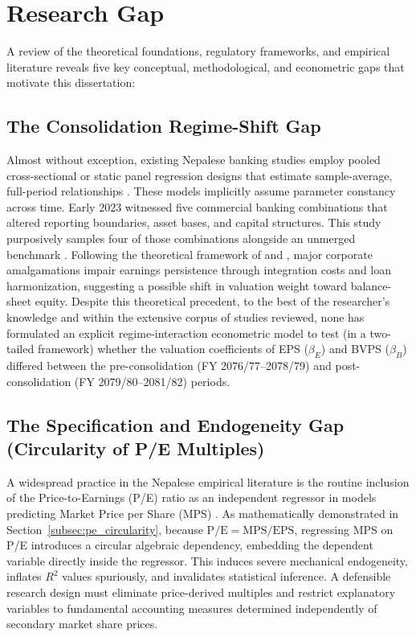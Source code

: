 \section{Research Gap}
\label{sec:research_gap}

A review of the theoretical foundations, regulatory frameworks, and empirical literature reveals five key conceptual, methodological, and econometric gaps that motivate this dissertation:

\subsection{The Consolidation Regime-Shift Gap}
Almost without exception, existing Nepalese banking studies employ pooled cross-sectional or static panel regression designs that estimate sample-average, full-period relationships \citep{bhattarai2014,chaudhari2025,chhetri2023,timalsina2026}. These models implicitly assume parameter constancy across time. Early 2023 witnessed five commercial banking combinations that altered reporting boundaries, asset bases, and capital structures. This study purposively samples four of those combinations alongside an unmerged benchmark \citep{nrb2023bsr}. Following the theoretical framework of \citet{kwon2020} and \citet{collins1997}, major corporate amalgamations impair earnings persistence through integration costs and loan harmonization, suggesting a possible shift in valuation weight toward balance-sheet equity. Despite this theoretical precedent, to the best of the researcher's knowledge and within the extensive corpus of studies reviewed, none has formulated an explicit regime-interaction econometric model to test (in a two-tailed framework) whether the valuation coefficients of EPS ($\beta_E$) and BVPS ($\beta_B$) differed between the pre-consolidation (FY 2076/77--2078/79) and post-consolidation (FY 2079/80--2081/82) periods.

\subsection{The Specification and Endogeneity Gap (Circularity of P/E Multiples)}
A widespread practice in the Nepalese empirical literature is the routine inclusion of the Price-to-Earnings (P/E) ratio as an independent regressor in models predicting Market Price per Share (MPS) \citep{almumani2014,bajracharya2019,bhandari2026,bhattarai2014,chhetri2023,dahal2025,giri2024,gurung2024,gurungdahal2025,gyawali2022,joshi2023,lamsal2024,malhotra2013,niroula2021,pant2024,pradhan2016,sharma2011,silwal2019,timalsina2026}. As mathematically demonstrated in Section~\ref{subsec:pe_circularity}, because $\text{P/E} = \text{MPS} / \text{EPS}$, regressing MPS on P/E introduces a circular algebraic dependency, embedding the dependent variable directly inside the regressor. This induces severe mechanical endogeneity, inflates $R^2$ values spuriously, and invalidates statistical inference. A defensible research design must eliminate price-derived multiples and restrict explanatory variables to fundamental accounting measures determined independently of secondary market share prices.

